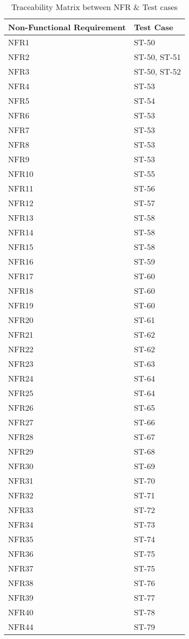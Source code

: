 \documentclass[12pt, titlepage]{article}
\begin{document}
	\begin{longtable}{|l|l|}
		\caption{Traceability Matrix between NFR \& Test cases}\\
		\hline
		Non-Functional Requirement &  Test Case\\
		\hline
		NFR1  & ST-50\\
		NFR2  & ST-50, ST-51\\
		NFR3  & ST-50, ST-52\\
		NFR4  & ST-53\\
		NFR5  & ST-54\\
		NFR6  & ST-53\\
		NFR7  & ST-53\\
		NFR8  & ST-53\\
		NFR9  & ST-53\\
		NFR10  & ST-55\\
		NFR11  & ST-56\\
		NFR12  & ST-57\\
		NFR13  & ST-58\\
		NFR14  & ST-58\\
		NFR15  & ST-58\\
		NFR16  & ST-59\\
		NFR17  & ST-60\\
		NFR18  & ST-60\\
		NFR19  & ST-60\\
		NFR20  & ST-61\\
		NFR21  & ST-62\\
		NFR22  & ST-62\\
		NFR23  & ST-63\\
		NFR24  & ST-64\\
		NFR25  & ST-64\\
		NFR26  & ST-65\\
		NFR27  & ST-66\\
		NFR28  & ST-67\\
		NFR29  & ST-68\\
		NFR30  & ST-69\\
		NFR31  & ST-70\\
		NFR32  & ST-71\\
		NFR33  & ST-72\\
		NFR34  & ST-73\\
		\hline
		\newpage
		\hline
		NFR35  & ST-74\\
		NFR36  & ST-75\\
		NFR37  & ST-75\\
		NFR38  & ST-76\\
		NFR39  & ST-77\\
		NFR40  & ST-78\\
		NFR44  & ST-79\\
		\hline
	\end{longtable}
	
\end{document}
